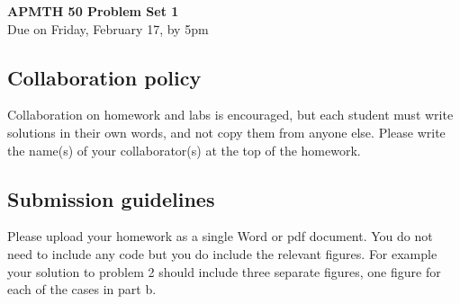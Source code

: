 \documentclass[12pt]{article}
\begin{document}
\begin{center}{\Large \bf{APMTH 50 Problem Set 1}} \vspace{0.2in}\\
{\large Due on Friday, February 17, by 5pm\\}
\end{center}

\subsection*{Collaboration policy}
Collaboration on homework and labs is
encouraged, but each student must write solutions in their own words, and not
copy them from anyone else.  Please write the name(s) of your collaborator(s) at the top of the homework.

\subsection*{Submission guidelines} Please upload your homework as a single Word or pdf document.  You do not need to include any code but you do include the relevant figures.  For example your solution to problem 2 should include three separate figures, one figure for each of the cases in part b. 

\end{document}
